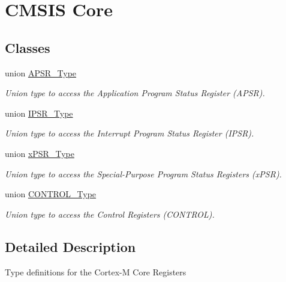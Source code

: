 \hypertarget{group___c_m_s_i_s___c_o_r_e}{\section{\-C\-M\-S\-I\-S \-Core}
\label{group___c_m_s_i_s___c_o_r_e}
}
\subsection*{\-Classes}
\begin{DoxyCompactItemize}
\item 
union \hyperlink{union_a_p_s_r___type}{\-A\-P\-S\-R\-\_\-\-Type}
\begin{DoxyCompactList}\small\item\em \-Union type to access the \-Application \-Program \-Status \-Register (\-A\-P\-S\-R). \end{DoxyCompactList}\item 
union \hyperlink{union_i_p_s_r___type}{\-I\-P\-S\-R\-\_\-\-Type}
\begin{DoxyCompactList}\small\item\em \-Union type to access the \-Interrupt \-Program \-Status \-Register (\-I\-P\-S\-R). \end{DoxyCompactList}\item 
union \hyperlink{unionx_p_s_r___type}{x\-P\-S\-R\-\_\-\-Type}
\begin{DoxyCompactList}\small\item\em \-Union type to access the \-Special-\/\-Purpose \-Program \-Status \-Registers (x\-P\-S\-R). \end{DoxyCompactList}\item 
union \hyperlink{union_c_o_n_t_r_o_l___type}{\-C\-O\-N\-T\-R\-O\-L\-\_\-\-Type}
\begin{DoxyCompactList}\small\item\em \-Union type to access the \-Control \-Registers (\-C\-O\-N\-T\-R\-O\-L). \end{DoxyCompactList}\end{DoxyCompactItemize}


\subsection{\-Detailed \-Description}
\-Type definitions for the \-Cortex-\/\-M \-Core \-Registers 